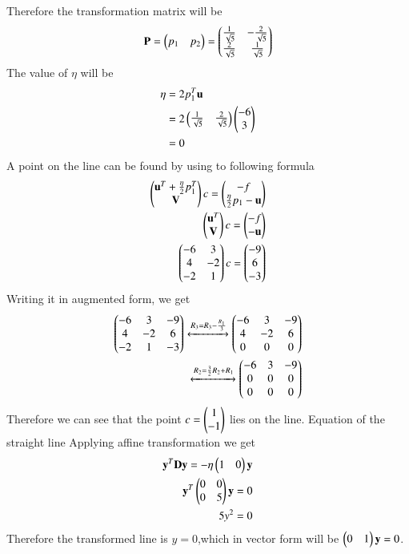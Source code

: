 Therefore the transformation matrix will be
\begin{align}
    \mathbf{P}=\begin{pmatrix}p_1&p_2\end{pmatrix}=\begin{pmatrix}\frac{1}{\sqrt{5}}&-\frac{2}{\sqrt{5}}\\\frac{2}{\sqrt{5}}&\frac{1}{\sqrt{5}}\end{pmatrix}
\end{align}
The value of $\eta$ will be
\begin{align}
    \eta&=2p_1^T\mathbf{u}\\
    &=2\begin{pmatrix}\frac{1}{\sqrt{5}}&\frac{2}{\sqrt{5}}\end{pmatrix}\begin{pmatrix}-6\\3\end{pmatrix}\\
    &=0
\end{align}
A point on the line can be found by using to following formula
\begin{align}
    \begin{pmatrix}\mathbf{u}^T+\frac{\eta}{2}p_1^T\\\mathbf{V}\end{pmatrix}c=\begin{pmatrix}-f\\\frac{\eta}{2}p_1-\mathbf{u}\end{pmatrix}\\
    \begin{pmatrix}\mathbf{u}^T\\\mathbf{V}\end{pmatrix}c=\begin{pmatrix}-f\\-\mathbf{u}\end{pmatrix}\\
    \begin{pmatrix}-6&3\\4&-2\\-2&1\end{pmatrix}c=\begin{pmatrix}-9\\6\\-3\end{pmatrix}
\end{align}
Writing it in augmented form, we get
\begin{align}
    \begin{pmatrix}-6&3&-9\\4&-2&6\\-2&1&-3\end{pmatrix}\xleftrightarrow{R_3=R_3-\frac{R_1}{3}}\begin{pmatrix}-6&3&-9\\4&-2&6\\0&0&0\end{pmatrix}\\
    \xleftrightarrow{R_2=\frac{3}{2}R_2+R_1}\begin{pmatrix}-6&3&-9\\0&0&0\\0&0&0\end{pmatrix}
\end{align}
Therefore we can see that the point $c=\begin{pmatrix}1\\-1\end{pmatrix}$ lies on the line.
{Equation of the straight line}
Applying affine transformation we get
\begin{align}
    \mathbf{y}^T\mathbf{D}\mathbf{y}=-\eta\begin{pmatrix}1&0\end{pmatrix}\mathbf{y}\\
    \mathbf{y}^T\begin{pmatrix}0&0\\0&5\end{pmatrix}\mathbf{y}=0\\
    5y^2=0
\end{align}
Therefore the transformed line is $y=0$,which in vector form will be $\begin{pmatrix}0&1\end{pmatrix}\mathbf{y}=0$.\par
